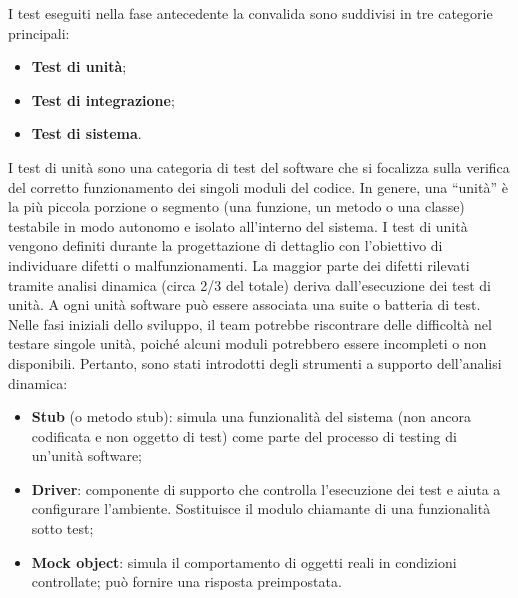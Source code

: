 \par I test eseguiti nella fase antecedente la convalida sono suddivisi in tre categorie principali:
\begin{itemize}
  \item \textbf{Test di unità};
  \item \textbf{Test di integrazione};
  \item \textbf{Test di sistema}.
\end{itemize}

\par I test di unità sono una categoria di test del software che si focalizza sulla verifica del corretto funzionamento dei singoli moduli del codice. In genere, una “unità” è la più piccola porzione o segmento (una funzione, un metodo o una classe) testabile in modo autonomo e isolato all’interno del sistema. I test di unità vengono definiti durante la progettazione di dettaglio con l’obiettivo di individuare difetti o malfunzionamenti. La maggior parte dei difetti rilevati tramite analisi dinamica (circa 2/3 del totale) deriva dall’esecuzione dei test di unità. A ogni unità software può essere associata una suite o batteria di test. Nelle fasi iniziali dello sviluppo, il team potrebbe riscontrare delle difficoltà nel testare singole unità, poiché alcuni moduli potrebbero essere incompleti o non disponibili. Pertanto, sono stati introdotti degli strumenti a supporto dell'analisi dinamica:
\begin{itemize}
  \item \textbf{Stub} (o metodo stub): simula una funzionalità del sistema (non ancora codificata e non oggetto di test) come parte del processo di testing di un’unità software;
  \item \textbf{Driver}: componente di supporto che controlla l'esecuzione dei test e aiuta a configurare l'ambiente. Sostituisce il modulo chiamante di una funzionalità sotto test;
  \item \textbf{Mock object}: simula il comportamento di oggetti reali in condizioni controllate; può fornire una risposta preimpostata.
\end{itemize}

